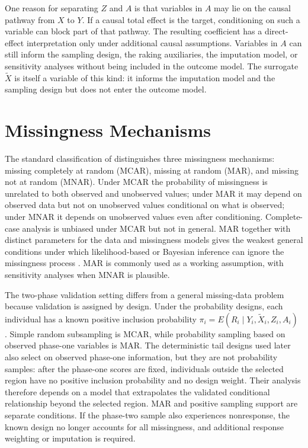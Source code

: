 One reason for separating $Z$ and $A$ is that variables in $A$ may lie on the causal pathway from $X$ to $Y$. If a causal total effect is the target, conditioning on such a variable can block part of that pathway. The resulting coefficient has a direct-effect interpretation only under additional causal assumptions. Variables in $A$ can still inform the sampling design, the raking auxiliaries, the imputation model, or sensitivity analyses without being included in the outcome model. The surrogate $\tilde{X}$ is itself a variable of this kind: it informs the imputation model and the sampling design but does not enter the outcome model.


\section{Missingness Mechanisms}
\label{sec:missing_mech}

The standard classification of \citet{rubin1976inference} distinguishes three missingness mechanisms: missing completely at random (MCAR), missing at random (MAR), and missing not at random (MNAR). Under MCAR the probability of missingness is unrelated to both observed and unobserved values; under MAR it may depend on observed data but not on unobserved values conditional on what is observed; under MNAR it depends on unobserved values even after conditioning. Complete-case analysis is unbiased under MCAR but not in general. MAR together with distinct parameters for the data and missingness models gives the weakest general conditions under which likelihood-based or Bayesian inference can ignore the missingness process \citep{rubin1976inference, little2019statistical}. MAR is commonly used as a working assumption, with sensitivity analyses when MNAR is plausible.

The two-phase validation setting differs from a general missing-data problem because validation is assigned by design. Under the probability designs, each individual has a known positive inclusion probability $\pi_i = E(R_i \mid Y_i, \tilde{X}_i, Z_i, A_i)$ \citep{neyman1938contribution}. Simple random subsampling is MCAR, while probability sampling based on observed phase-one variables is MAR. The deterministic tail designs used later also select on observed phase-one information, but they are not probability samples: after the phase-one scores are fixed, individuals outside the selected region have no positive inclusion probability and no design weight. Their analysis therefore depends on a model that extrapolates the validated conditional relationship beyond the selected region. MAR and positive sampling support are separate conditions. If the phase-two sample also experiences nonresponse, the known design no longer accounts for all missingness, and additional response weighting or imputation is required.


